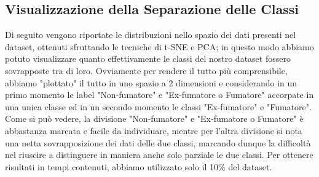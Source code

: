 \newpage

\subsection{Visualizzazione della Separazione delle Classi}

Di seguito vengono riportate le distribuzioni nello spazio dei dati presenti nel dataset, ottenuti sfruttando le tecniche di t-SNE e PCA; in questo modo abbiamo potuto visualizzare quanto effettivamente le classi del nostro dataset fossero sovrapposte tra di loro. 
Ovviamente per rendere il tutto più comprensibile, abbiamo "plottato" il tutto in uno spazio a 2 dimensioni e considerando in un primo momento le label "Non-fumatore" e "Ex-fumatore o Fumatore" accorpate in una unica classe ed in un secondo momento le classi "Ex-fumatore" e "Fumatore". 
Come si può vedere, la divisione "Non-fumatore" e "Ex-fumatore o Fumatore" è abbastanza marcata e facile da individuare, mentre per l'altra divisione si nota una netta sovrapposizione dei dati delle due classi, marcando dunque la difficoltà nel riuscire a distinguere in maniera anche solo parziale le due classi. 
Per ottenere risultati in tempi contenuti, abbiamo utilizzato solo il 10\% del dataset.

